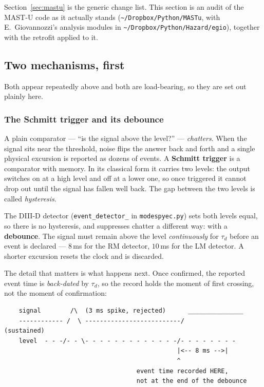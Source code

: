 \documentclass[11pt,a4paper]{article}
\newcommand{\code}[1]{\texttt{\small #1}}
\begin{document}
Section~\ref{sec:mastu} is the generic change list. This section is an audit of the
MAST-U code as it actually stands (\code{\textasciitilde/Dropbox/Python/MASTu}, with
E.~Giovannozzi's analysis modules in \code{\textasciitilde/Dropbox/Python/Hazard/egio}),
together with the retrofit applied to it.

\subsection{Two mechanisms, first}

Both appear repeatedly above and both are load-bearing, so they are set out plainly here.

\subsubsection{The Schmitt trigger and its debounce}

A plain comparator --- ``is the signal above the level?'' --- \emph{chatters}. When the
signal sits near the threshold, noise flips the answer back and forth and a single
physical excursion is reported as dozens of events. A \textbf{Schmitt trigger} is a
comparator with memory. In its classical form it carries two levels: the output switches
on at a high level and off at a lower one, so once triggered it cannot drop out until the
signal has fallen well back. The gap between the two levels is called \emph{hysteresis}.

The DIII-D detector (\code{event\_detector\_} in \code{modespyec.py}) sets both levels
equal, so there is no hysteresis, and suppresses chatter a different way: with a
\textbf{debounce}. The signal must remain above the level \emph{continuously} for
$\tau_d$ before an event is declared --- $8$\,ms for the RM detector, $10$\,ms for the LM
detector. A shorter excursion resets the clock and is discarded.

The detail that matters is what happens next. Once confirmed, the reported event time is
\emph{back-dated} by $\tau_d$, so the record holds the moment of first crossing, not the
moment of confirmation:

\begin{verbatim}
    signal        /\  (3 ms spike, rejected)      _______________
    ------------ /  \ --------------------------/                (sustained)
    level  - - -/- - \- - - - - - - - - - - - -/- - - - - - - -
                                               |<-- 8 ms -->|
                                               ^
                                    event time recorded HERE,
                                    not at the end of the debounce
\end{verbatim}
\end{document}

